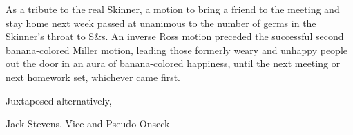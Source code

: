 \documentclass[12pt]{article}
\begin{document}
As a tribute to the real Skinner, a motion to bring a friend to the meeting and stay home next week passed at unanimous to the number of germs in the Skinner's throat to S&s. An inverse Ross motion preceded the successful second banana-colored Miller motion, leading those formerly weary and unhappy people out the door in an aura of banana-colored happiness, until the next meeting or next homework set, whichever came first.

\vspace{12pt}

\centerline{Juxtaposed alternatively,}
\centerline{Jack Stevens, Vice and Pseudo-Onseck}
\end{document}
